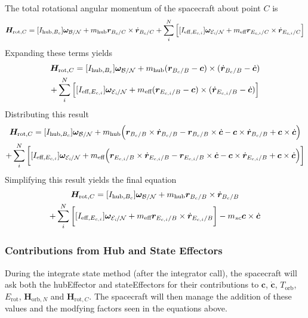 The total rotational angular momentum of the spacecraft about point $C$ is
\begin{multline}
\bm H_{\text{rot},C} = [I_{\text{hub},B_c}] \bm \omega_{\cal{B/N}} + m_{\text{hub}} \bm r_{B_c/C}\times \dot{\bm r}_{B_c/C}
+ \sum\limits_{i}^{N}\Big[[I_{\text{eff},E_{c,i}}] \bm \omega_{\cal{E}_{\textit{i}}/\cal{N}}
+ m_{\text{eff}} \bm r_{E_{c,i}/C} \times \dot{\bm r}_{E_{c,i}/C} \Big]
\end{multline}
Expanding these terms yields
\begin{multline}
\bm H_{\text{rot},C} = [I_{\text{hub},B_c}] \bm \omega_{\cal{B/N}} + m_{\text{hub}} (\bm r_{B_c/B} - \bm c)\times (\dot{\bm r}_{B_c/B} - \dot{\bm c})\\
+ \sum\limits_{i}^{N}\Big[[I_{\text{eff},E_{c,i}}] \bm \omega_{\cal{E}_{\textit{i}}/\cal{N}}
+ m_{\text{eff}} (\bm r_{E_{c,i}/B} - \bm c) \times (\dot{\bm r}_{E_{c,i}/B} - \dot{\bm c}) \Big]
\end{multline}
Distributing this result
\begin{multline}
\bm H_{\text{rot},C} = [I_{\text{hub},B_c}] \bm \omega_{\cal{B/N}} + m_{\text{hub}} \Big(\bm r_{B_c/B} \times \dot{\bm r}_{B_c/B} - \bm r_{B_c/B} \times \dot{\bm c} - \bm c \times \dot{\bm r}_{B_c/B} + \bm c \times \dot{\bm c}\Big)\\
+ \sum\limits_{i}^{N}\bigg[[I_{\text{eff},E_{c,i}}] \bm \omega_{\cal{E}_{\textit{i}}/\cal{N}}
+ m_{\text{eff}} \Big(\bm r_{E_{c,i}/B} \times \dot{\bm r}_{E_{c,i}/B} - \bm r_{E_{c,i}/B} \times \dot{\bm c} - \bm c \times \dot{\bm r}_{E_{c,i}/B} + \bm c \times \dot{\bm c}\Big) \bigg]
\end{multline}
Simplifying this result yields the final equation
\begin{multline}
\bm H_{\text{rot},C} = [I_{\text{hub},B_c}] \bm \omega_{\cal{B/N}} + m_{\text{hub}} \bm r_{B_c/B} \times \dot{\bm r}_{B_c/B}\\
+ \sum\limits_{i}^{N}\bigg[[I_{\text{eff},E_{c,i}}] \bm \omega_{\cal{E}_{\textit{i}}/\cal{N}}
+ m_{\text{eff}} \bm r_{E_{c,i}/B} \times \dot{\bm r}_{E_{c,i}/B} \bigg] - m_{sc} \bm c \times \dot{\bm c}
\end{multline}

\subsubsection{Contributions from Hub and State Effectors}
During the integrate state method (after the integrator call), the spacecraft will ask both the hubEffector and stateEffectors for their contributions to $\bm c$, $\dot{\bm c}$, $T_{\text{orb}}$, $E_{\text{rot}}$, $\bm H_{\text{orb},N}$ and $\bm H_{\text{rot},C}$. The spacecraft will then manage the addition of these values and the modfying factors seen in the equations above.
